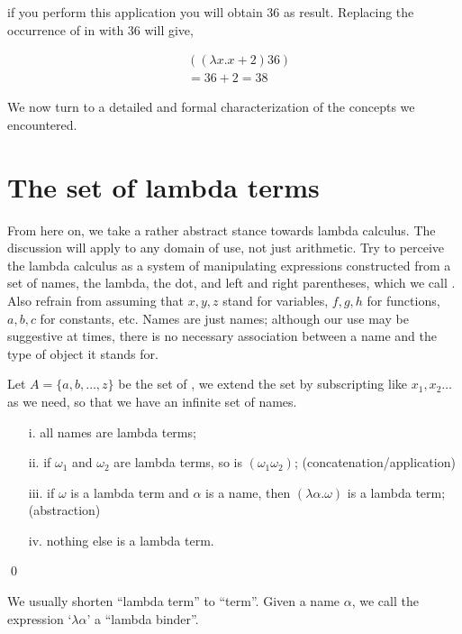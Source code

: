 \documentclass[11pt]{article}
\begin{document}
if you perform this application you will obtain 36 as result. Replacing the occurrence of  in  with 36 will give,

\begin{align}
& ((\lambda x. x+2)36)\\
& = 36+2 = 38 \nonumber
\end{align}


We now turn to a detailed and formal characterization of the concepts we encountered.


\section{The set of lambda terms}

From here on, we take a rather abstract stance towards lambda calculus.  The discussion will apply to any domain of use, not just arithmetic. Try to perceive the lambda calculus as a system of manipulating expressions constructed from a set of names, the lambda, the dot, and left and right parentheses, which we call . Also refrain from assuming that $x, y, z$ stand for variables, $f, g, h$ for functions, $a, b, c$  for constants, etc. Names are just names; although our use may be suggestive at times, there is no necessary association between a name and the type of object it stands for.

\begin{udefinition}\label{dfexp}
Let $A=\{ a,b,\ldots,z\}$ be the set of , we extend the set by subscripting like $x_1,x_2\ldots$ as we need, so that we have an infinite set of names.

\begin{itemize}
\item[i.] all names are lambda terms; 
\item[ii.] if $\omega_1$ and $\omega_2$ are lambda terms, so is $(\omega_1\omega_2)$; \hfill (concatenation/application)
\item[iii.] if $\omega$ is a lambda term and $\alpha$ is a name, then
$(\lambda\alpha.\omega)$ is a lambda term; \hfill (abstraction) 
\item[iv.] nothing else is a lambda term.
\end{itemize}
\qed
\end{udefinition} 

We usually shorten ``lambda term'' to ``term''. Given a name $\alpha$, we call the expression `$\lambda\alpha$' a ``lambda binder''.
\end{document}
